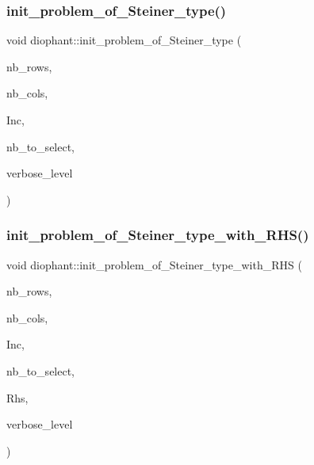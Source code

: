 \subsubsection{\texorpdfstring{init\+\_\+problem\+\_\+of\+\_\+\+Steiner\+\_\+type()}{init\_problem\_of\_Steiner\_type()}}
{\footnotesize\ttfamily void diophant\+::init\+\_\+problem\+\_\+of\+\_\+\+Steiner\+\_\+type (\begin{DoxyParamCaption}\item[{\mbox{\hyperlink{galois_8h_a09fddde158a3a20bd2dcadb609de11dc}{I\+NT}}}]{nb\+\_\+rows,  }\item[{\mbox{\hyperlink{galois_8h_a09fddde158a3a20bd2dcadb609de11dc}{I\+NT}}}]{nb\+\_\+cols,  }\item[{\mbox{\hyperlink{galois_8h_a09fddde158a3a20bd2dcadb609de11dc}{I\+NT}} $\ast$}]{Inc,  }\item[{\mbox{\hyperlink{galois_8h_a09fddde158a3a20bd2dcadb609de11dc}{I\+NT}}}]{nb\+\_\+to\+\_\+select,  }\item[{\mbox{\hyperlink{galois_8h_a09fddde158a3a20bd2dcadb609de11dc}{I\+NT}}}]{verbose\+\_\+level }\end{DoxyParamCaption})}

\mbox{\label{classdiophant_afec4aea287c456909705c5f09369ff63}} 
\subsubsection{\texorpdfstring{init\+\_\+problem\+\_\+of\+\_\+\+Steiner\+\_\+type\+\_\+with\+\_\+\+R\+H\+S()}{init\_problem\_of\_Steiner\_type\_with\_RHS()}}
{\footnotesize\ttfamily void diophant\+::init\+\_\+problem\+\_\+of\+\_\+\+Steiner\+\_\+type\+\_\+with\+\_\+\+R\+HS (\begin{DoxyParamCaption}\item[{\mbox{\hyperlink{galois_8h_a09fddde158a3a20bd2dcadb609de11dc}{I\+NT}}}]{nb\+\_\+rows,  }\item[{\mbox{\hyperlink{galois_8h_a09fddde158a3a20bd2dcadb609de11dc}{I\+NT}}}]{nb\+\_\+cols,  }\item[{\mbox{\hyperlink{galois_8h_a09fddde158a3a20bd2dcadb609de11dc}{I\+NT}} $\ast$}]{Inc,  }\item[{\mbox{\hyperlink{galois_8h_a09fddde158a3a20bd2dcadb609de11dc}{I\+NT}}}]{nb\+\_\+to\+\_\+select,  }\item[{\mbox{\hyperlink{galois_8h_a09fddde158a3a20bd2dcadb609de11dc}{I\+NT}} $\ast$}]{Rhs,  }\item[{\mbox{\hyperlink{galois_8h_a09fddde158a3a20bd2dcadb609de11dc}{I\+NT}}}]{verbose\+\_\+level }\end{DoxyParamCaption})}

